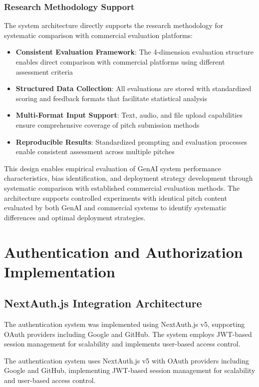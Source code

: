 \subsubsection{Research Methodology Support}
The system architecture directly supports the research methodology for systematic comparison with commercial evaluation platforms:

\begin{itemize}
  \item \textbf{Consistent Evaluation Framework}: The 4-dimension evaluation structure enables direct comparison with commercial platforms using different assessment criteria
  \item \textbf{Structured Data Collection}: All evaluations are stored with standardized scoring and feedback formats that facilitate statistical analysis
  \item \textbf{Multi-Format Input Support}: Text, audio, and file upload capabilities ensure comprehensive coverage of pitch submission methods
  \item \textbf{Reproducible Results}: Standardized prompting and evaluation processes enable consistent assessment across multiple pitches
\end{itemize}

This design enables empirical evaluation of GenAI system performance characteristics, bias identification, and deployment strategy development through systematic comparison with established commercial evaluation methods. The architecture supports controlled experiments with identical pitch content evaluated by both GenAI and commercial systems to identify systematic differences and optimal deployment strategies.


\section{Authentication and Authorization Implementation}

\subsection{NextAuth.js Integration Architecture}
The authentication system was implemented using NextAuth.js v5, supporting OAuth providers including Google and GitHub. The system employs JWT-based session management for scalability and implements user-based access control.

The authentication system uses NextAuth.js v5 with OAuth providers including Google and GitHub, implementing JWT-based session management for scalability and user-based access control.

